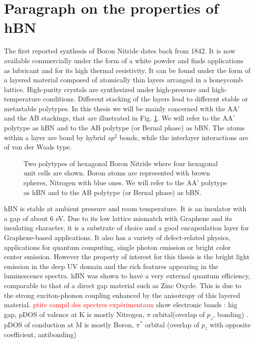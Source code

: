 \section*{Paragraph on the properties of hBN}
The first reported synthesis of Boron Nitride dates back from 1842.\cite{balmain1842xlvi} It is now available commercially under the form of a white powder and finds applications as lubricant and for its high thermal resistivity. It can be found under the form of a layered material composed of atomically thin layers arranged in a honeycomb lattice. High-purity crystals are synthesized under high-pressure and high-temperature conditions.\cite{watanabe2004direct} 
Different stacking of the layers lead to different stable or metastable polytypes. In this thesis we will be mainly concerned with the AA' and the AB stackings, that are illustrated in Fig. \ref{fig:hBN_stackings}. We will refer to the AA' polytype as hBN and to the AB polytype (or Bernal phase) as bBN. The atoms within a layer are bond by hybrid $sp^2$ bonds, while the interlayer interactions are of van der Waals type.
\begin{figure}[h!b]%
	\vspace{0.2cm}
	\setcapindent{2em}
	\centering
     \qquad
    \caption{Two polytypes of hexagonal Boron Nitride where four hexagonal unit cells are shown. Boron atoms are represented with brown spheres, Nitrogen with blue ones. We will refer to the AA' polytype as hBN and to the AB polytype (or Bernal phase) as bBN.}
	\label{fig:hBN_stackings}
\end{figure}
%
hBN is stable at ambient pressure and room temperature. It is an insulator with a gap of about 6 eV. Due to its low lattice mismatch with Graphene and its insulating character, it is a substrate of choice and a good encapsulation layer for Graphene-based applications.\cite{kretinin2014electronic} It also has a variety of defect-related physics,  applications for quantum computing,\cite{ivady2020ab} single photon emission\cite{grosso2017tunable} or bright color center emission.\cite{wigger2019phonon} However the property of interest for this thesis is the bright light emission in the deep UV domain and the rich features appearing in the luminescence spectra. hBN was shown to have a very external quantum efficiency, comparable to that of a direct gap material such as Zinc Oxyde.\cite{schue2019bright} This is due to the strong exciton-phonon coupling enhanced by the anisotropy of this layered material. 
\textcolor{red}{ptite compil des spectres expérimentaux}
%
show electronic bands : hig gap, pDOS of valence at K is mostly Nitrogen, $\pi$ orbital(overlap of $p_z$, bonding)  . pDOS of conduction at M is mostly Boron, $\pi^*$ orbital \cite{galvani2016excitons,sponza2018direct}(overlap of $p_z$ with opposite coefficient, antibonding)\\


